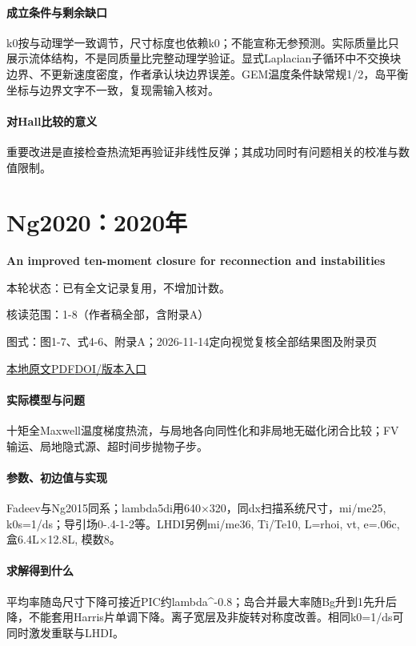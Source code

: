 \paragraph{成立条件与剩余缺口}k0按与动理学一致调节，尺寸标度也依赖k0；不能宣称无参预测。实际质量比只展示流体结构，不是同质量比完整动理学验证。显式Laplacian子循环中不交换块边界、不更新速度密度，作者承认块边界误差。GEM温度条件缺常规1/2，岛平衡坐标与边界文字不一致，复现需输入核对。

\paragraph{对Hall比较的意义}重要改进是直接检查热流矩再验证非线性反弹；其成功同时有问题相关的校准与数值限制。

\section{Ng2020：2020年}\label{paper:Ng2020}

\textbf{An improved ten-moment closure for reconnection and instabilities}\citep{Ng2020}

\textsf{本轮状态：}已有全文记录复用，不增加计数。

\textsf{核读范围：}1-8（作者稿全部，含附录A）\par\textsf{图式：}图1-7、式4-6、附录A；2026-11-14定向视觉复核全部结果图及附录页

\href{run:../../papers/Ng2020.pdf}{本地原文PDF}\quad\href{https://doi.org/10.1063/5.0012067}{DOI/版本入口}

\paragraph{实际模型与问题}十矩全Maxwell温度梯度热流，与局地各向同性化和非局地无磁化闭合比较；FV输运、局地隐式源、超时间步抛物子步。

\paragraph{参数、初边值与实现}Fadeev与Ng2015同系；lambda5di用640×320，同dx扫描系统尺寸，mi/me25, k0s=1/ds；导引场0-.4-1-2等。LHDI另例mi/me36, Ti/Te10, L=rhoi, vt, e=.06c, 盒6.4L×12.8L, 模数8。

\paragraph{求解得到什么}平均率随岛尺寸下降可接近PIC约lambda\textasciicircum{}-0.8；岛合并最大率随Bg升到1先升后降，不能套用Harris片单调下降。离子宽层及非旋转对称度改善。相同k0=1/ds可同时激发重联与LHDI。

